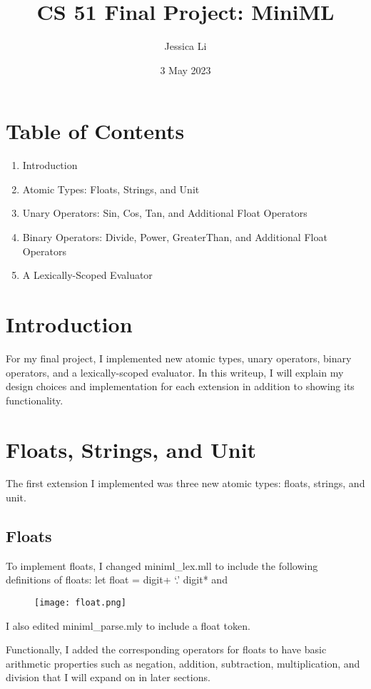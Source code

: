 \documentclass[12pt]{article}
\title{CS 51 Final Project: MiniML}
\author{Jessica Li }
\date{3 May 2023}
\begin{document}
\maketitle

\section*{Table of Contents}

\begin{enumerate}
  \item Introduction
  \item Atomic Types: Floats, Strings, and Unit
  \item Unary Operators: Sin, Cos, Tan, and Additional Float Operators
  \item Binary Operators: Divide, Power, GreaterThan, and Additional Float Operators
  \item A Lexically-Scoped Evaluator
\end{enumerate}

\section{Introduction}

For my final project, I implemented new atomic types, unary operators, binary operators, and a lexically-scoped evaluator. In this writeup, I will explain my design choices and implementation for each extension in addition to showing its functionality.

\section{Floats, Strings, and Unit}

The first extension I implemented was three new atomic types: floats, strings, and unit. 

\subsection*{Floats}
To implement floats, I changed miniml\_lex.mll to include the following definitions of floats: let float = digit+ `.' digit* and 

\begin{figure}[hbt]
    \centering
    \texttt{[image: float.png]}
\end{figure}

I also edited miniml\_parse.mly to include a float token. 

Functionally, I added the corresponding operators for floats to have basic arithmetic properties such as negation, addition, subtraction, multiplication, and division that I will expand on in later sections.
\end{document}
